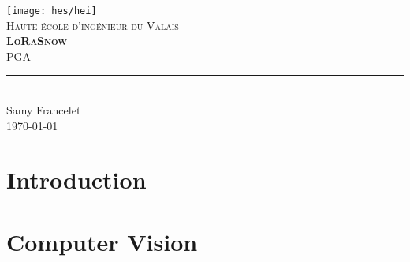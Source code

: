 \documentclass[11pt,titlepage]{report}
\begin{document}
\begin{titlepage}
	\centering
    \texttt{[image: hes/hei]}\\[1cm] 	%
    \textsc{\LARGE Haute école d'ingénieur du Valais}\\ \vspace{\fill}
    \textbf{\textsc{\fontsize{35}{35}\selectfont LoRaSnow}}\\ \vspace{\fill}
	\textsc{\LARGE PGA}\\[0.4cm]
	\rule{\linewidth}{0.2 mm} \\[0.5 cm]
	Samy Francelet \\
	\today
\end{titlepage}
\restoregeometry

\tableofcontents

\chapter{Introduction}


\chapter{Computer Vision}


\printbibliography[heading=bibintoc]
\end{document}
